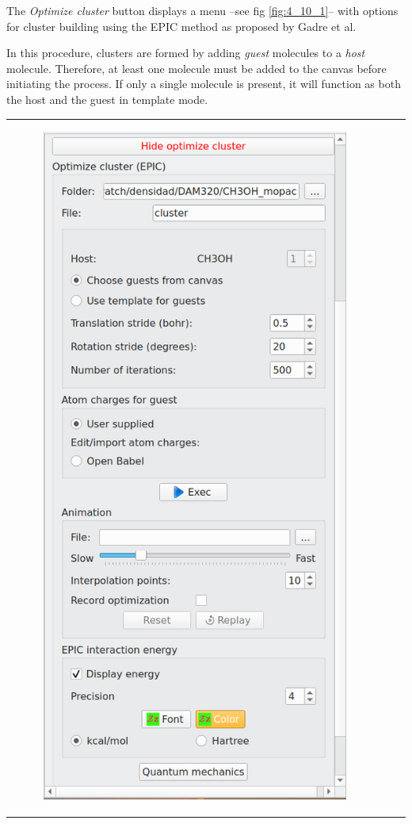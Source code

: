 \documentclass[10pt]{article}
\begin{document}
The {\it Optimize cluster} button displays a menu  
--see fig \ref{fig:4_10_1}-- with options for  
cluster building using the EPIC method as proposed by Gadre et al.\footnotemark  
{}  

In this procedure, clusters are formed by adding {\it guest} molecules to  
a {\it host} molecule. Therefore, at least one molecule must be  
added to the canvas before initiating the process. If only a single molecule  
is present, it will function as both the host and the guest in template mode.  


\vspace*{5mm}

\begin{tabular}{lcr}
\begin{minipage}{.3\linewidth}
    \begin{figure}[H]
        \begin{center}
            \includegraphics[width=0.68\linewidth]{damqt320_mespimizer_1.png}

\end{center}
\end{figure}
\end{minipage}
\end{tabular}
\end{document}
